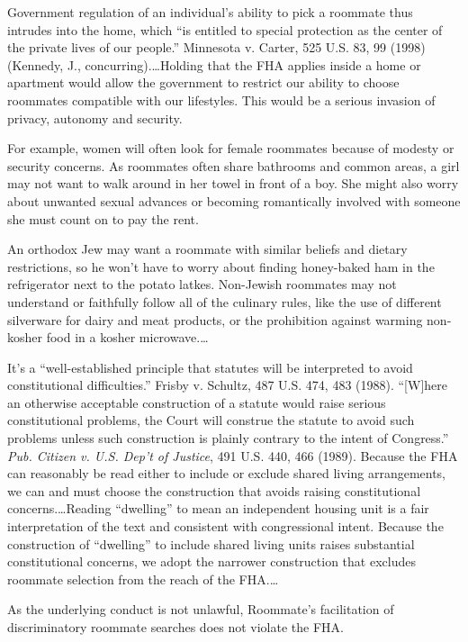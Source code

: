 Government regulation of an individual's ability to pick a roommate thus
intrudes into the home, which ``is entitled to special protection as the center
of the private lives of our people.'' Minnesota v. Carter, 525 U.S. 83, 99
(1998) (Kennedy, J., concurring).\ldots Holding that the FHA applies inside a
home or apartment would allow the government to restrict our ability to choose
roommates compatible with our lifestyles. This would be a serious invasion of
privacy, autonomy and security.

For example, women will often look for female roommates because of modesty or
security concerns. As roommates often share bathrooms and common areas, a girl
may not want to walk around in her towel in front of a boy. She might also
worry about unwanted sexual advances or becoming romantically involved with
someone she must count on to pay the rent.

An orthodox Jew may want a roommate with similar beliefs and dietary
restrictions, so he won't have to worry about finding honey-baked ham in the
refrigerator next to the potato latkes. Non-Jewish roommates may not understand
or faithfully follow all of the culinary rules, like the use of different
silverware for dairy and meat products, or the prohibition against warming
non-kosher food in a kosher microwave.\ldots

It's a ``well-established principle that statutes will be interpreted to avoid
constitutional difficulties.'' Frisby v. Schultz, 487 U.S. 474, 483 (1988).
``[W]here an otherwise acceptable construction of a statute would raise serious
constitutional problems, the Court will construe the statute to avoid such
problems unless such construction is plainly contrary to the intent of
Congress.'' \textit{Pub. Citizen v. U.S. Dep't of Justice}, 491 U.S. 440, 466
(1989). Because the FHA can reasonably be read either to include or exclude
shared living arrangements, we can and must choose the construction that avoids
raising constitutional concerns.\ldots Reading ``dwelling'' to mean an
independent housing unit is a fair interpretation of the text and consistent
with congressional intent. Because the construction of ``dwelling'' to include
shared living units raises substantial constitutional concerns, we adopt the
narrower construction that excludes roommate selection from the reach of the
FHA.\ldots

As the underlying conduct is not unlawful, Roommate's facilitation of
discriminatory roommate searches does not violate the FHA.


